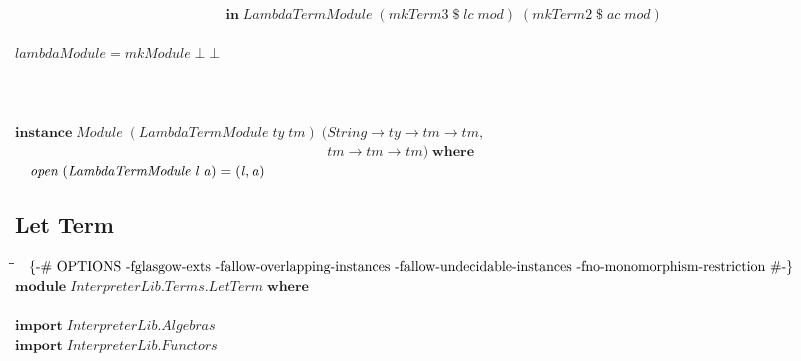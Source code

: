 \documentclass[10pt]{article}
\newlength{\lwidth}\setlength{\lwidth}{4.5cm}
\newlength{\cwidth}\setlength{\cwidth}{8mm} %
\newcommand{\Conid}[1]{\mathit{#1}}
\newcommand{\Varid}[1]{\mathit{#1}}
\begin{document}
\begin{tabbing}
${\phantom{\Varid{mkModule}\;(\Varid{x}\mathbin{::}\Varid{ty})\;(\Varid{y}\mathbin{::}\Varid{tm})\mathrel{=}\mbox{}}\mathbf{in}\;\Conid{LambdaTermModule}\;(\Varid{mkTerm3}\mathbin{\$}\Varid{lc}\;\Varid{mod})\;(\Varid{mkTerm2}\mathbin{\$}\Varid{ac}\;\Varid{mod})}$\\
${}$\\
${\Varid{lambdaModule}\mathrel{=}\Varid{mkModule}\;\bot \;\bot }$\\
${}$\\
${}$\\
${}$\\
${\mathbf{instance}\;\Conid{Module}\;(\Conid{LambdaTermModule}\;\Varid{ty}\;\Varid{tm})\;(\Conid{String}\to \Varid{ty}\to \Varid{tm}\to \Varid{tm},}$\\
${\phantom{\mathbf{instance}\;\Conid{Module}\;(\Conid{LambdaTermModule}\;\Varid{ty}\;\Varid{tm})\;(\mbox{}}\Varid{tm}\to \Varid{tm}\to \Varid{tm})\;\mathbf{where}}$\\
${\hskip1.00em\relax\Varid{open}\;(\Conid{LambdaTermModule}\;\Varid{l}\;\Varid{a})\mathrel{=}(\Varid{l},\Varid{a})}$
\end{tabbing}
\subsection{Let Term}
\begin{tabbing}
\qquad\=\hspace{\lwidth}\=\hspace{\cwidth}\=\+\kill
${\mbox{\enskip\{-\# OPTIONS -fglasgow-exts -fallow-overlapping-instances -fallow-undecidable-instances -fno-monomorphism-restriction  \#-\}\enskip}}$\\
${\mathbf{module}\;\Conid{\Conid{InterpreterLib}.\Conid{Terms}.LetTerm}\;\mathbf{where}}$\\
${}$\\
${\mathbf{import}\;\Conid{\Conid{InterpreterLib}.Algebras}}$\\
${\mathbf{import}\;\Conid{\Conid{InterpreterLib}.Functors}}$
\end{tabbing}
\end{document}
